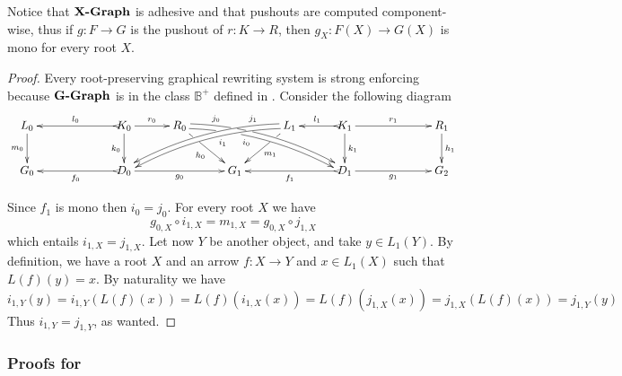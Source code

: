 \documentclass[a4paper,UKenglish,cleveref,pdftex,thm-restate,numberwithinsect]{lipics-v2021}
\newcommand{\gph}[1]{\textbf{\textup{{#1}-Graph}}}
\def\G{\textbf {\textup{G}}}
\begin{document}
\begin{remark}\label{rem:po}
	Notice that $\gph{X}$ is adhesive and that pushouts are computed component-wise, thus if $g\colon F\to G$ is the pushout of $r\colon K\to R$, then $g_X\colon F(X)\to G(X)$ is mono for every root $X$.
\end{remark}


\lemVTame*
\label{lemVTame}


\begin{proof}
	Every root-preserving graphical rewriting system is strong enforcing because $\gph{G}$ is in the class $\mathbb{B}^+$ defined in .  Consider the following diagram 
	\[\xymatrix@R=25pt@C=30pt{L_0 \ar[d]_{m_0}&& K_0
		\ar[d]_{k_0}\ar@{>->}[ll]_{l_0} \ar[r]^{r_0} & R_0
		\ar@<-.5ex>@/^.35cm/[drrr]|(.23)\hole|(.34)\hole_(.4){i_0} 	\ar@<.5ex>@/^.35cm/[drrr]^(.2){j_0}|(.31)\hole |(.4)\hole
		\ar[dr]|(.3)\hole_{h_0} && L_1 \ar@<.5ex>@/_.35cm/[dlll]^(.4){i_1} \ar@<-.5ex>@/_.35cm/[dlll]_(.2){j_1}
		\ar[dl]|(.3)\hole^{m_1}& K_1 \ar[d]^{k_1}\ar@{>->}[l]_{l_1}
		\ar[rr]^{r_1} && R_1 \ar[d]^{h_1}\\G_0 && \ar@{>->}[ll]^{f_0}
		D_0 \ar[rr]_{g_0}&& G_1 && \ar@{>->}[ll]^{f_1} D_1
		\ar[rr]_{g_1}&& G_2}\] 
	
	Since $f_1$ is mono then $i_0=j_0$. For every  root $X$ we have
	\[g_{0,X}\circ i_{1,X}=m_{1,X}=g_{0,X}\circ j_{1,X}\]
	which entails $i_{1,X}=j_{1,X}$. Let now $Y$ be another object, and take $y\in L_1(Y)$. By definition, we have a root $X$ and an arrow $f:X\to Y$ and $x\in L_{1}(X)$ such that $L(f)(y)=x$. By naturality we have
	\[i_{1,Y}(y)=i_{1,Y}(L(f)(x))=L(f)(i_{1, X}(x))=L(f)(j_{1, X}(x))=j_{1,X}(L(f)(x))=j_{1,Y}(y)\]
Thus $i_{1,Y}=j_{1,Y}$, as wanted.
\end{proof}

\iffalse 
\subsubsection{Proofs for }
\end{document}
